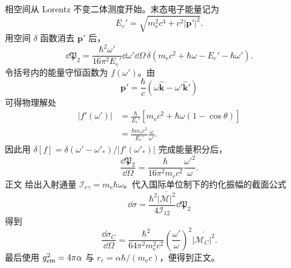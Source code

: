 \begin{derivation}
相空间从 Lorentz 不变二体测度开始。末态电子能量记为
\begin{equation*}
 E_e'=\sqrt{m_{\mathrm e}^2c^4+c^2|\mathbf p'|^2}.
\end{equation*}
用空间 $\delta$ 函数消去 $\mathbf p'$ 后，
\begin{equation*}
 \dd\mathfrak P_2
 =\frac{\hbar^2\omega'}{16\pi^2E_e'}
 \dd\omega'\dd\Omega\,
 \delta\!\left(m_{\mathrm e} c^2+\hbar\omega-E_e'-\hbar\omega'\right).
\end{equation*}
令括号内的能量守恒函数为 $f(\omega')$。由
\begin{equation*}
 \mathbf p'=\frac{\hbar}{c}
 (\omega\hat{\mathbf k}-\omega'\hat{\mathbf k}')
\end{equation*}
可得物理解处
\begin{align*}
 |f'(\omega')|
 &=\frac{\hbar}{E_e'}
 \left[m_{\mathrm e} c^2+\hbar\omega(1-\cos\theta)\right]\\
 &=\frac{\hbar m_{\mathrm e} c^2}{E_e'}\frac\omega{\omega'}.
\end{align*}
因此用 $\delta[f]=\delta(\omega'-\omega'_*)/|f'(\omega'_*)|$ 完成能量积分后，
\begin{equation*}
 \frac{\dd\mathfrak P_2}{\dd\Omega}
 =\frac{\hbar}{16\pi^2m_{\mathrm e} c^2}\frac{\omega'^2}{\omega}.
\end{equation*}
正文 给出入射通量
$\mathcal I_{e\gamma}=m_{\mathrm e}\hbar\omega$。代入国际单位制下的约化振幅的截面公式
\begin{equation*}
 \dd\sigma
 =\frac{\hbar^2\overline{|\mathcal M|^2}}{4\mathcal I_{12}}
 \dd\mathfrak P_2
\end{equation*}
得到
\begin{equation*}
 \frac{\dd\sigma_C}{\dd\Omega}
 =\frac{\hbar^2}{64\pi^2m_{\mathrm e}^2c^2}
 \left(\frac{\omega'}\omega\right)^2
 \overline{|\mathcal M_C|^2}.
\end{equation*}
最后使用 $g_{\rm em}^2=4\pi\alpha$ 与
$r_e=\alpha\hbar/(m_{\mathrm e} c)$，便得到正文。
\end{derivation}

